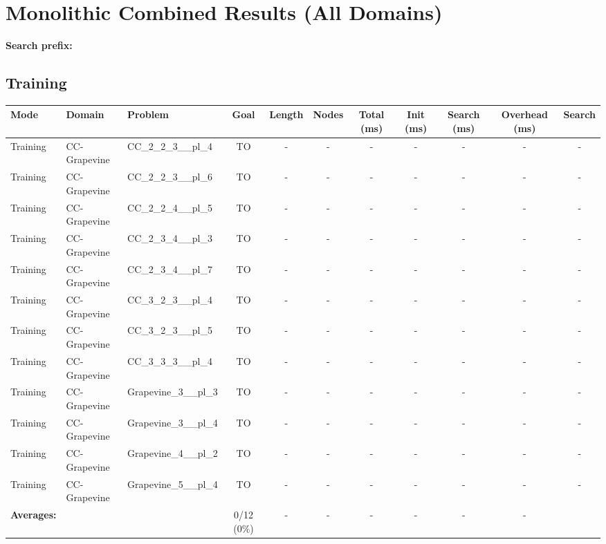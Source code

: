 \documentclass{article}
\begin{document}
\section*{Monolithic Combined Results (All Domains)}
\textbf{Search prefix:} 
\\[0.5cm]
\subsection*{Training}
\begin{tabular}{lllcccccccc}
\toprule
Mode & Domain & Problem & Goal & Length & Nodes & Total (ms) & Init (ms) & Search (ms) & Overhead (ms) & Search \\
\midrule
Training & CC-Grapevine & CC\_2\_2\_3\_\_pl\_4 & TO & - & - & - & - & - & - & - \\
Training & CC-Grapevine & CC\_2\_2\_3\_\_pl\_6 & TO & - & - & - & - & - & - & - \\
Training & CC-Grapevine & CC\_2\_2\_4\_\_pl\_5 & TO & - & - & - & - & - & - & - \\
Training & CC-Grapevine & CC\_2\_3\_4\_\_pl\_3 & TO & - & - & - & - & - & - & - \\
Training & CC-Grapevine & CC\_2\_3\_4\_\_pl\_7 & TO & - & - & - & - & - & - & - \\
Training & CC-Grapevine & CC\_3\_2\_3\_\_pl\_4 & TO & - & - & - & - & - & - & - \\
Training & CC-Grapevine & CC\_3\_2\_3\_\_pl\_5 & TO & - & - & - & - & - & - & - \\
Training & CC-Grapevine & CC\_3\_3\_3\_\_pl\_4 & TO & - & - & - & - & - & - & - \\
Training & CC-Grapevine & Grapevine\_3\_\_pl\_3 & TO & - & - & - & - & - & - & - \\
Training & CC-Grapevine & Grapevine\_3\_\_pl\_4 & TO & - & - & - & - & - & - & - \\
Training & CC-Grapevine & Grapevine\_4\_\_pl\_2 & TO & - & - & - & - & - & - & - \\
Training & CC-Grapevine & Grapevine\_5\_\_pl\_4 & TO & - & - & - & - & - & - & - \\
\textbf{Averages:} & & & 0/12 (0\%) & - & - & - & - & - & - & \\
\bottomrule
\end{tabular}
\newpage
\end{document}
